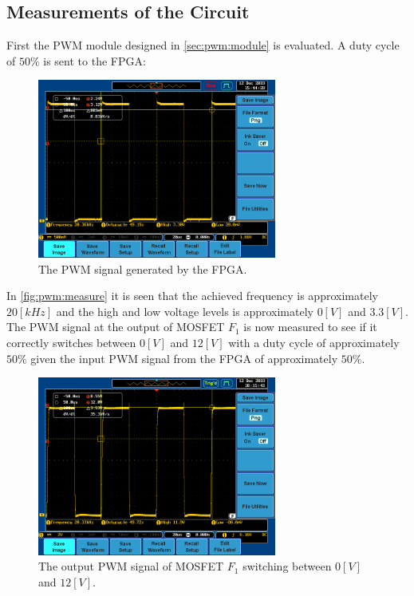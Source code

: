 \documentclass[../report.tex]{subfiles}
\begin{document}
\subsection{Measurements of the Circuit}
First the PWM module designed in \autoref{sec:pwm:module} is evaluated. A duty cycle of $50 \%$ is sent to the FPGA:
\begin{figure}[H]
    \centering
         \includegraphics[width=0.7\textwidth]{figures/measurements/PWM_signal.PNG}
     \caption{The PWM signal generated by the FPGA.}
     \label{fig:pwm:measure}
\end{figure}
In \autoref{fig:pwm:measure} it is seen that the achieved frequency is approximately $20 [kHz]$ and the high and low voltage levels is approximately $0 [V]$ and $3.3 [V]$.\\
The PWM signal at the output of MOSFET $F_1$ is now measured to see if it correctly switches between $0 [V]$ and $12 [V]$ with a duty cycle of approximately $50 \%$ given the input PWM signal from the FPGA of approximately $50 \%$.
\begin{figure}[H]
    \centering
         \includegraphics[width=0.7\textwidth]{figures/measurements/F1_mosfet.PNG}
     \caption{The output PWM signal of MOSFET $F_1$ switching between $0 [V]$ and $12 [V]$.}
     \label{fig:pwm:measure:F1}
\end{figure}
\end{document}
